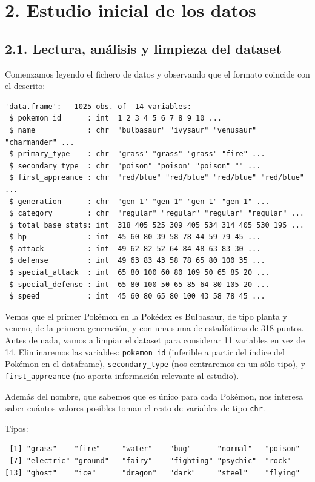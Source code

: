 \documentclass[
  11.8pt,
]{extreport}
\begin{document}
\chapter{2. Estudio inicial de los
datos}\label{estudio-inicial-de-los-datos}

\section{2.1. Lectura, análisis y limpieza del
dataset}\label{lectura-anuxe1lisis-y-limpieza-del-dataset}

Comenzamos leyendo el fichero de datos y observando que el formato
coincide con el descrito:

\begin{verbatim}
'data.frame':   1025 obs. of  14 variables:
 $ pokemon_id      : int  1 2 3 4 5 6 7 8 9 10 ...
 $ name            : chr  "bulbasaur" "ivysaur" "venusaur" "charmander" ...
 $ primary_type    : chr  "grass" "grass" "grass" "fire" ...
 $ secondary_type  : chr  "poison" "poison" "poison" "" ...
 $ first_appreance : chr  "red/blue" "red/blue" "red/blue" "red/blue" ...
 $ generation      : chr  "gen 1" "gen 1" "gen 1" "gen 1" ...
 $ category        : chr  "regular" "regular" "regular" "regular" ...
 $ total_base_stats: int  318 405 525 309 405 534 314 405 530 195 ...
 $ hp              : int  45 60 80 39 58 78 44 59 79 45 ...
 $ attack          : int  49 62 82 52 64 84 48 63 83 30 ...
 $ defense         : int  49 63 83 43 58 78 65 80 100 35 ...
 $ special_attack  : int  65 80 100 60 80 109 50 65 85 20 ...
 $ special_defense : int  65 80 100 50 65 85 64 80 105 20 ...
 $ speed           : int  45 60 80 65 80 100 43 58 78 45 ...
\end{verbatim}

Vemos que el primer Pokémon en la Pokédex es Bulbasaur, de tipo planta y
veneno, de la primera generación, y con una suma de estadísticas de 318
puntos. Antes de nada, vamos a limpiar el dataset para considerar 11
variables en vez de 14. Eliminaremos las variables: \texttt{pokemon\_id}
(inferible a partir del índice del Pokémon en el dataframe),
\texttt{secondary\_type} (nos centraremos en un sólo tipo), y
\texttt{first\_appreance} (no aporta información relevante al estudio).

Además del nombre, que sabemos que es único para cada Pokémon, nos
interesa saber cuántos valores posibles toman el resto de variables de
tipo \texttt{chr}.

Tipos:

\begin{verbatim}
 [1] "grass"    "fire"     "water"    "bug"      "normal"   "poison"  
 [7] "electric" "ground"   "fairy"    "fighting" "psychic"  "rock"    
[13] "ghost"    "ice"      "dragon"   "dark"     "steel"    "flying"  
\end{verbatim}
\end{document}
